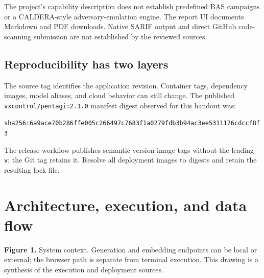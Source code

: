 \documentclass[11pt,letterpaper]{article}
\newcommand{\code}[1]{\nolinkurl{#1}}
\newcommand{\src}[1]{\cite{#1}}
\begin{document}
The project's capability description does not establish predefined BAS campaigns
or a CALDERA-style adversary-emulation engine. The report UI documents Markdown
and PDF downloads. Native SARIF output and direct GitHub code-scanning submission
are not established by the reviewed sources. \src{readme}

\subsection{Reproducibility has two layers}
The source tag identifies the application revision. Container tags, dependency
images, model aliases, and cloud behavior can still change. The published
\code{vxcontrol/pentagi:2.1.0} manifest digest observed for this handout was:

{\small\code{sha256:6a9ace70b286ffe005c266497c7683f1a0279fdb3b94ac3ee5311176cdccf8f3}}

The release workflow publishes semantic-version image tags without the leading
\code{v}; the Git tag retains it. Resolve all deployment images to digests and
retain the resulting lock file. \src{image,ci,compose-config}

\clearpage
\section{Architecture, execution, and data flow}
\label{sec:architecture}
\begin{center}
\end{center}
{\small\textbf{Figure 1.} System context. Generation and embedding endpoints can
be local or external; the browser path is separate from terminal execution.
This drawing is a synthesis of the execution and deployment sources.
\src{flow,compose,docker-doc}}
\end{document}
